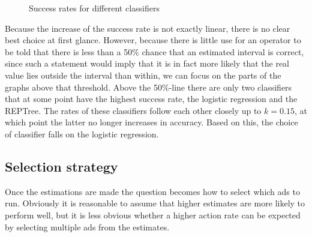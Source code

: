 \documentclass{sig-alternate}
\begin{document}
\begin{figure}[htpb]
\begin{center}

	\caption{Success rates for different classifiers}
	\label{fig:ClassifierComparison}
\end{center}
\end{figure}

Because the increase of the success rate is not exactly linear, there is no clear best choice at first glance. However, because there is little use for an operator to be told that there is less than a 50\% chance that an estimated interval is correct, since such a statement would imply that it is in fact more likely that the real value lies outside the interval than within, we can focus on the parts of the graphs above that threshold. Above the 50\%-line there are only two classifiers that at some point have the highest success rate, the logistic regression and the REPTree. The rates of these classifiers follow each other closely up to \(k=0.15\), at which point the latter no longer increases in accuracy. Based on this, the choice of classifier falls on the logistic regression.

\subsection{Selection strategy}
Once the estimations are made the question becomes how to select which ads to run. Obviously it is reasonable to assume that higher estimates are more likely to perform well, but it is less obvious whether a higher action rate can be expected by selecting multiple ads from the estimates.
\end{document}

